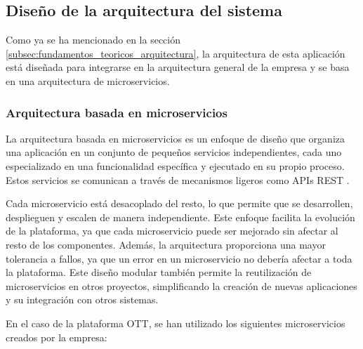 \subsection{Diseño de la arquitectura del sistema}
\label{subsec:diseno:ott:arquitectura}

Como ya se ha mencionado en la sección \ref{subsec:fundamentos_teoricos_arquitectura}, 
la arquitectura de esta aplicación está diseñada para integrarse en la arquitectura general 
de la empresa y se basa en una arquitectura de microservicios.

\subsubsection{Arquitectura basada en microservicios}
\label{subsec:diseno:ott:arquitectura_microservicios}

La arquitectura basada en microservicios es un enfoque de diseño que organiza una aplicación en un conjunto 
de pequeños servicios independientes, cada uno especializado en una funcionalidad específica y ejecutado en 
su propio proceso. Estos servicios se comunican a través de mecanismos ligeros como APIs REST \cite{Microservices}.

Cada microservicio está desacoplado del resto, lo que permite que se desarrollen, desplieguen y escalen de 
manera independiente. Este enfoque facilita la evolución de la plataforma, ya que cada microservicio puede ser 
mejorado sin afectar al resto de los componentes. Además, la arquitectura proporciona una mayor tolerancia a fallos, 
ya que un error en un microservicio no debería afectar a toda la plataforma. Este diseño modular también permite 
la reutilización de microservicios en otros proyectos, simplificando la creación de nuevas aplicaciones y su 
integración con otros sistemas.

En el caso de la plataforma OTT, se han utilizado los siguientes microservicios creados por la empresa:


